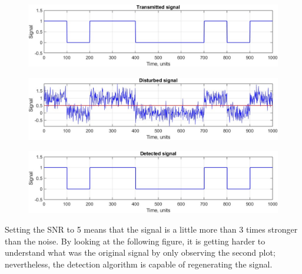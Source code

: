 \begin{figure}[h!]
    \centering
    \includegraphics[width = .85\textwidth]{lab-2/imgs/task4.2_Transmitted.jpg}
\end{figure}
\vspace{-15px}
\begin{figure}[h!]
    \centering
    \includegraphics[width = .85\textwidth]{lab-2/imgs/task4.2_Noise.jpg}
\end{figure}
\vspace{-15px}
\begin{figure}[h!]
    \centering
    \includegraphics[width = .85\textwidth]{lab-2/imgs/task4.2_Detected.jpg}
\end{figure}

\FloatBarrier\noindent Setting the SNR to 5 means that the signal is a little more than 3 times stronger than the noise. By looking at the following figure, it is getting harder to understand what was the original signal by only observing the second plot; nevertheless, the detection algorithm is capable of regenerating the signal.

